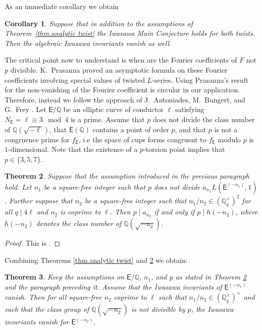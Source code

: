 \documentclass{amsart}
\newcommand{\DK}[1]{\textcolor{purple}{#1}}
\newcommand{\KM}[1]{\textcolor{OliveGreen}{#1}}
\newtheorem{theorem}{Theorem}[section]
\newtheorem{corollary}[theorem]{Corollary}
\numberwithin{equation}{section}
\theoremstyle{remark}
\newcommand{\Q}{\mathbb{Q}}
\newcommand{\EC}{\mathsf{E}}
\theoremstyle{plain} %
\begin{document}
As an immediate corollary we obtain

\begin{corollary}
Suppose that in addition to the assumptions of Theorem~\ref{thm.analytic twist} the Iwasawa Main Conjecture holds for both twists.
Then the algebraic Iwasawa invariants vanish as well.
\end{corollary}


The critical point now to understand is when are the Fourier coefficients of $F$ not $p$ divisible.
K.~Prasanna proved an asymptotic formula on these Fourier coefficients involving special values of twisted $L$-series. Using Prasanna's result for the non-vanishing of the Fourier coefficient is circular in our application.
Therefore, instead we follow the approach of J.~Antoniades, M.~Bungert, and G.~Frey \cite[Section~4]{frey-all}.
Let $\EC/\Q$ be an elliptic curve of conductor $\ell$ satisfying $N_{\EC} = \ell \equiv 3\mod 4$ is a prime.
Assume that $p$ does not divide the class number of $\Q(\sqrt{-\ell})$, that $\EC(\Q)$ contains a point of order $p$, and that $p$ is not a congruence prime for $f_{\EC}$, i.e the space of cups forms congruent to $f_{\EC}$  modulo $p$ is $1$-dimensional.
Note that the existence of a $p$-torsion point implies that $p\in \{3,5,7\}$. 

\begin{theorem}
\label{frey}
Suppose that the assumption introduced in the previous paragraph hold. 
Let $n_1$ be a square-free integer such that $p$ does not divide $a_{n_1}L(\EC^{(-n_1)},1)$.
Further suppose that $n_2$ be a square-free integer such that $n_1/n_2\in (\Q_q^\times)^2$ for all $q\mid 4\ell$ and $n_2$ is coprime to $\ell$.
Then $p\mid a_{n_2}$ if and only if $p\mid h(-n_2)$,
where $h(-n_2)$ denotes the class number of $\Q(\sqrt{-n_2})$.
\end{theorem}

\begin{proof}
This is \cite[Proposition~4.8]{frey-all}.    
\end{proof}

Combining Theorems \ref{thm.analytic twist} and \ref{frey} we obtain:


\begin{theorem}
\label{central-thm-analytic}
Keep the assumptions on $\EC/\Q$, $n_1$, and $p$ as stated in Theorem \ref{frey} and the paragraph preceding it.
Assume that the Iwasawa invariants of $\EC^{(-n_1)}$ vanish. Then for all square-free $n_2$ coprime to $\ell$ such that $n_1/n_2\in (\Q_q^\times)^\times$ and such that the class group of $\Q(\sqrt{-n_2})$ is not divisible by $p$, the Iwasawa invariants vanish for $\EC^{(-n_2)}$.
\end{theorem}
\end{document}
